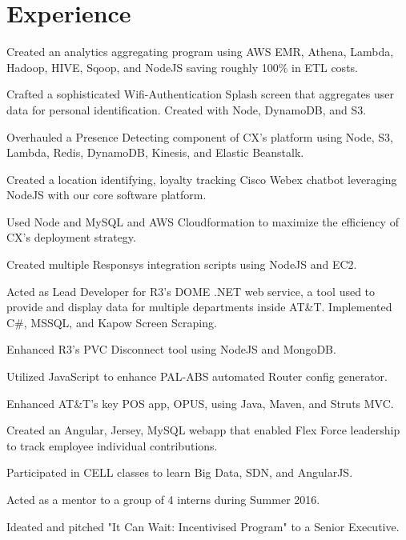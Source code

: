 \documentclass[]{deedy-resume-openfont}
\begin{document}
\begin{minipage}[t]{0.66\textwidth} 


\section{Experience}

\vspace{\topsep} %
\begin{tightemize}
\item Created an analytics aggregating program using AWS EMR, Athena, Lambda, Hadoop, HIVE, Sqoop, and NodeJS  saving roughly 100\% in ETL costs.
\item Crafted a sophisticated Wifi-Authentication Splash screen that aggregates user data for personal identification. Created with Node, DynamoDB, and S3.
\item Overhauled a Presence Detecting component of CX's platform using Node, S3, Lambda, Redis, DynamoDB, Kinesis, and Elastic Beanstalk.
\item Created a location identifying, loyalty tracking Cisco Webex chatbot leveraging NodeJS with our core software platform.
\item Used Node and MySQL and AWS Cloudformation to maximize the efficiency of CX's deployment strategy.
\item Created multiple Responsys integration scripts using NodeJS and EC2.
\end{tightemize}
\sectionsep

\begin{tightemize}
\item Acted as Lead Developer for R3’s DOME .NET web service, a tool used to provide and display data for multiple departments inside AT\&T. Implemented C\#, MSSQL, and Kapow Screen Scraping.
\item Enhanced R3's PVC Disconnect tool using NodeJS and MongoDB.
\item Utilized JavaScript to enhance PAL-ABS automated Router config generator.
\item Enhanced AT\&T's key POS app, OPUS, using Java, Maven, and Struts MVC.
\item Created an Angular, Jersey, MySQL webapp that enabled Flex Force leadership to track employee individual contributions.
\item Participated in CELL classes to learn Big Data, SDN, and AngularJS.
\item Acted as a mentor to a group of 4 interns during Summer 2016.
\item Ideated and pitched "It Can Wait: Incentivised Program" to a Senior Executive.
\end{tightemize}
\sectionsep


\end{minipage}
\end{document}
